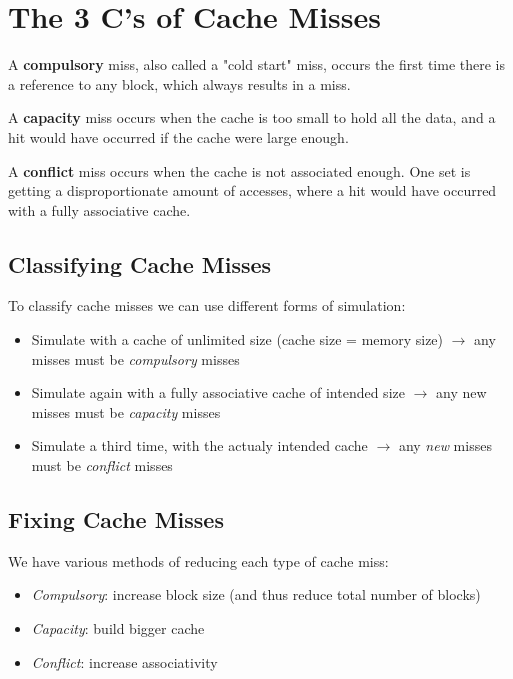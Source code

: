 \section{The 3 C's of Cache Misses}

\begin{definition}
  A \textbf{compulsory} miss, also called a "cold start" miss, occurs the first time there is a reference to any block, which always results in a miss.
\end{definition}

\begin{definition}
  A \textbf{capacity} miss occurs when the cache is too small to hold all the data, and a hit would have occurred if the cache were large enough.
\end{definition}

\begin{definition}
  A \textbf{conflict} miss occurs when the cache is not associated enough. One set is getting a disproportionate amount of accesses, where a hit would have occurred with a fully associative cache.
\end{definition}

\subsection{Classifying Cache Misses}

To classify cache misses we can use different forms of simulation:
\begin{itemize}
  \item Simulate with a cache of unlimited size (cache size = memory size) \(\to\) any misses must be \emph{compulsory} misses
  \item Simulate again with a fully associative cache of intended size \(\to\) any new misses must be \emph{capacity} misses
  \item Simulate a third time, with the actualy intended cache \(\to\) any \emph{new} misses must be \emph{conflict} misses
\end{itemize}

\subsection{Fixing Cache Misses}

We have various methods of reducing each type of cache miss:
\begin{itemize}
  \item \emph{Compulsory}: increase block size (and thus reduce total number of blocks)
  \item \emph{Capacity}: build bigger cache
  \item \emph{Conflict}: increase associativity
\end{itemize}

